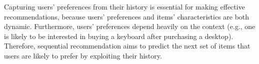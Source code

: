 
Capturing users' preferences from their history is essential for making effective recommendations, because users' preferences and items' characteristics are both dynamic. Furthermore, users' preferences depend heavily on the context (e.g., one is likely to be interested in buying a keyboard after purchasing a desktop). Therefore, sequential recommendation aims to predict the next set of items that users are likely to prefer by exploiting their history.



